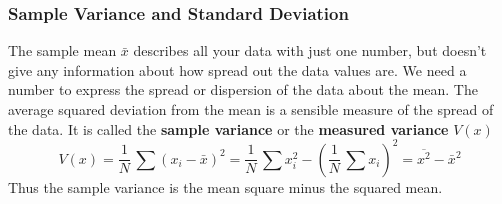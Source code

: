 \documentclass[12pt]{article}
\begin{document}
\subsubsection*{Sample Variance and Standard Deviation}     
\noindent The sample mean $\bar{x}$ describes all your data with just one number, but
  doesn't give any information about how spread out the data values are.
We need a number to express the spread or dispersion of the data about the mean.
The average squared deviation from the mean is a sensible measure of the spread
  of the data.
It is called the \textbf{sample variance} or the \textbf{measured variance}   $V(x)$
\begin{equation}   \label{eq:mv3}
 V(x) = \frac{1}{N}\,\sum (x_i - \bar{x})^2 = \frac{1}{N}\, \sum x_i^2 - \left(\frac{1}{N}\,\sum x_i \right)^2 = \overline{x^2} - \bar{x}^2
\end{equation}
Thus the sample variance is the mean square minus the squared mean.\\
\end{document}
